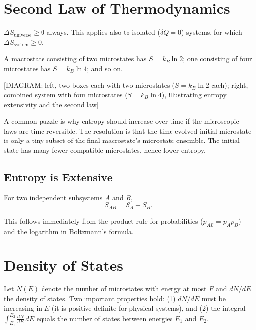 \section{Second Law of Thermodynamics}

\begin{theorem}
$\Delta S_{\text{universe}} \geq 0$ always. This applies also to isolated ($\delta Q = 0$) systems, for which $\Delta S_{\text{system}} \geq 0$.
\end{theorem}

A macrostate consisting of two microstates has $S = k_B \ln 2$; one consisting of four microstates has $S = k_B \ln 4$; and so on.

\begin{center}[DIAGRAM: left, two boxes each with two microstates ($S = k_B \ln 2$ each); right, combined system with four microstates ($S = k_B \ln 4$), illustrating entropy extensivity and the second law]\end{center}

A common puzzle is why entropy should increase over time if the microscopic laws are time-reversible. The resolution is that the time-evolved initial microstate is only a tiny subset of the final macrostate's microstate ensemble. The initial state has many fewer compatible microstates, hence lower entropy.

\subsection{Entropy is Extensive}

\begin{fact}
For two independent subsystems $A$ and $B$,
\begin{equation}
    S_{AB} = S_A + S_B.
\end{equation}
\end{fact}
This follows immediately from the product rule for probabilities ($p_{AB} = p_A p_B$) and the logarithm in Boltzmann's formula.

\section{Density of States}

Let $N(E)$ denote the number of microstates with energy at most $E$ and $dN/dE$ the density of states. Two important properties hold: (1) $dN/dE$ must be increasing in $E$ (it is positive definite for physical systems), and (2) the integral $\int_{E_1}^{E_2} \frac{dN}{dE}\,dE$ equals the number of states between energies $E_1$ and $E_2$.

